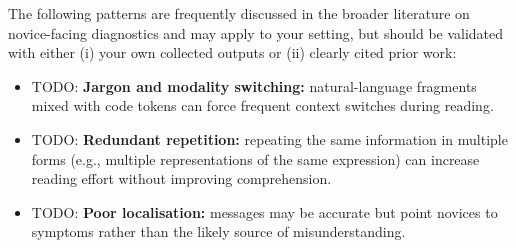 \begin{justify}
The following patterns are frequently discussed in the broader literature on novice-facing
diagnostics and may apply to your setting, but should be validated with either (i) your own
collected outputs or (ii) clearly cited prior work:

\skipS\begin{itemize}
    \item TODO: \textbf{Jargon and modality switching:} natural-language fragments mixed with code
        tokens can force frequent context switches during reading.
    \item TODO: \textbf{Redundant repetition:} repeating the same information in multiple forms
        (e.g., multiple representations of the same expression) can increase reading effort without
        improving comprehension.
    \item TODO: \textbf{Poor localisation:} messages may be accurate but point novices to symptoms
        rather than the likely source of misunderstanding.
\end{itemize}
\end{justify}






